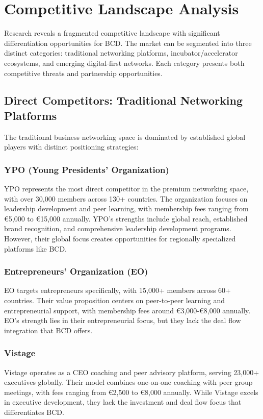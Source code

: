 \section{Competitive Landscape Analysis}

Research reveals a fragmented competitive landscape with significant differentiation opportunities for BCD. The market can be segmented into three distinct categories: traditional networking platforms, incubator/accelerator ecosystems, and emerging digital-first networks. Each category presents both competitive threats and partnership opportunities.

\subsection{Direct Competitors: Traditional Networking Platforms}

The traditional business networking space is dominated by established global players with distinct positioning strategies:

\subsubsection{YPO (Young Presidents' Organization)}
YPO represents the most direct competitor in the premium networking space, with over 30,000 members across 130+ countries. The organization focuses on leadership development and peer learning, with membership fees ranging from €5,000 to €15,000 annually. YPO's strengths include global reach, established brand recognition, and comprehensive leadership development programs. However, their global focus creates opportunities for regionally specialized platforms like BCD.

\subsubsection{Entrepreneurs' Organization (EO)}
EO targets entrepreneurs specifically, with 15,000+ members across 60+ countries. Their value proposition centers on peer-to-peer learning and entrepreneurial support, with membership fees around €3,000-€8,000 annually. EO's strength lies in their entrepreneurial focus, but they lack the deal flow integration that BCD offers.

\subsubsection{Vistage}
Vistage operates as a CEO coaching and peer advisory platform, serving 23,000+ executives globally. Their model combines one-on-one coaching with peer group meetings, with fees ranging from €2,500 to €8,000 annually. While Vistage excels in executive development, they lack the investment and deal flow focus that differentiates BCD.

